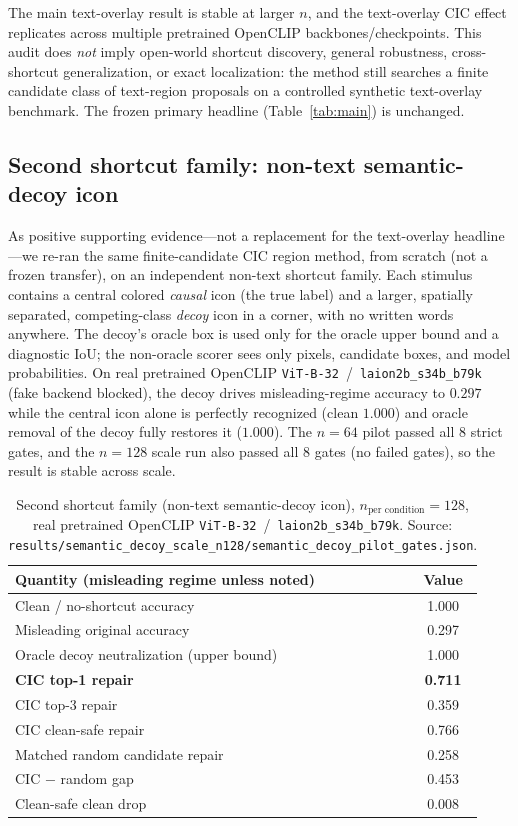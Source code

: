 \documentclass[11pt]{article}
\begin{document}
The main text-overlay result is stable at larger $n$, and the text-overlay CIC
effect replicates across multiple pretrained OpenCLIP backbones/checkpoints. This
audit does \emph{not} imply open-world shortcut discovery, general robustness,
cross-shortcut generalization, or exact localization: the method still searches a
finite candidate class of text-region proposals on a controlled synthetic
text-overlay benchmark. The frozen primary headline (Table~\ref{tab:main}) is
unchanged.

\subsection{Second shortcut family: non-text semantic-decoy icon}
As positive supporting evidence---not a replacement for the text-overlay
headline---we re-ran the same finite-candidate CIC region method, from scratch
(not a frozen transfer), on an independent non-text shortcut family. Each stimulus
contains a central colored \emph{causal} icon (the true label) and a larger,
spatially separated, competing-class \emph{decoy} icon in a corner, with no written
words anywhere. The decoy's oracle box is used only for the oracle upper bound and a
diagnostic IoU; the non-oracle scorer sees only pixels, candidate boxes, and model
probabilities. On real pretrained OpenCLIP \texttt{ViT-B-32}~/~\texttt{laion2b\_s34b\_b79k}
(fake backend blocked), the decoy drives misleading-regime accuracy to $0.297$
while the central icon alone is perfectly recognized (clean $1.000$) and oracle
removal of the decoy fully restores it ($1.000$). The $n=64$ pilot passed all $8$
strict gates, and the $n=128$ scale run also passed all $8$ gates (no failed
gates), so the result is stable across scale.

\begin{table}[t]
\centering
\caption{Second shortcut family (non-text semantic-decoy icon), $n_{\text{per
condition}}=128$, real pretrained OpenCLIP \texttt{ViT-B-32}~/~\texttt{laion2b\_s34b\_b79k}.
Source: \texttt{results/semantic\_decoy\_scale\_n128/semantic\_decoy\_pilot\_gates.json}.}
\label{tab:semdecoy}
\small
\begin{tabular}{lc}
\toprule
Quantity (misleading regime unless noted) & Value \\
\midrule
Clean / no-shortcut accuracy & 1.000 \\
Misleading original accuracy & 0.297 \\
Oracle decoy neutralization (upper bound) & 1.000 \\
\textbf{CIC top-1 repair} & \textbf{0.711} \\
CIC top-3 repair & 0.359 \\
CIC clean-safe repair & 0.766 \\
Matched random candidate repair & 0.258 \\
CIC $-$ random gap & 0.453 \\
Clean-safe clean drop & 0.008 \\
\bottomrule
\end{tabular}
\end{table}
\end{document}
